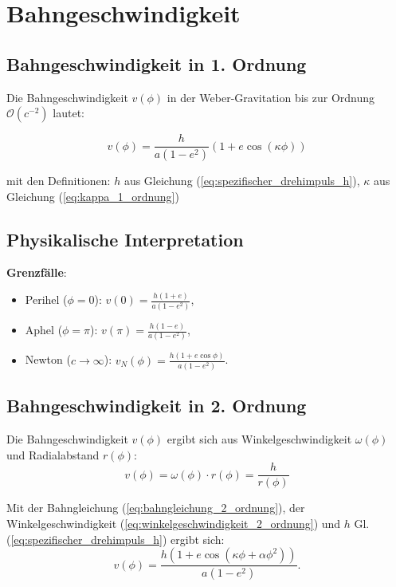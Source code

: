 \newpage
\section{Bahngeschwindigkeit}
\subsection{Bahngeschwindigkeit in 1. Ordnung}
Die Bahngeschwindigkeit \(v(\phi)\) in der Weber-Gravitation bis zur Ordnung \(\mathcal{O}(c^{-2})\) lautet:

\begin{equation}
v(\phi) = \frac{h}{a(1 - e^2)} \left(1 + e \cos\left(\kappa\phi\right)\right)
\end{equation}

\noindent mit den Definitionen:
$h$ aus Gleichung (\ref{eq:spezifischer_drehimpuls_h}), $\kappa$ aus Gleichung (\ref{eq:kappa_1_ordnung})

\subsection*{Physikalische Interpretation}
\textbf{Grenzfälle}:
\begin{itemize}
    \item Perihel (\(\phi = 0\)): \(v(0) = \frac{h(1 + e)}{a(1 - e^2)}\),
    \item Aphel (\(\phi = \pi\)): \(v(\pi) = \frac{h(1 - e)}{a(1 - e^2)}\),
    \item Newton (\(c \to \infty\)): \(v_N(\phi) = \frac{h(1 + e \cos\phi)}{a(1 - e^2)}\).
\end{itemize}

\subsection{Bahngeschwindigkeit in 2. Ordnung}
Die Bahngeschwindigkeit $v(\phi)$ ergibt sich aus Winkelgeschwindigkeit $\omega(\phi)$ und Radialabstand $r(\phi)$:
\[
v(\phi) = \omega(\phi) \cdot r(\phi) = \frac{h}{r(\phi)}
\]

Mit der Bahngleichung (\ref{eq:bahngleichung_2_ordnung}), der Winkelgeschwindigkeit (\ref{eq:winkelgeschwindigkeit_2_ordnung}) und $h$ Gl. (\ref{eq:spezifischer_drehimpuls_h}) ergibt sich:
\begin{equation}
v(\phi) = \frac{h \left(1 + e\cos(\kappa\phi + \alpha\phi^2)\right)}{a(1 - e^2)}.
\end{equation}

